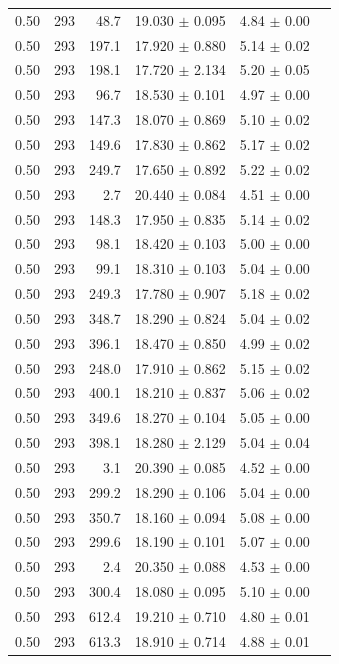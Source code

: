 \begin{table}[ht]
\begin{tabular}{lrrrrr}
0.50 & 293 & 48.7 & 19.030 $\pm$ 0.095 & 4.84 $\pm$ 0.00 \\
0.50 & 293 & 197.1 & 17.920 $\pm$ 0.880 & 5.14 $\pm$ 0.02 \\
0.50 & 293 & 198.1 & 17.720 $\pm$ 2.134 & 5.20 $\pm$ 0.05 \\
0.50 & 293 & 96.7 & 18.530 $\pm$ 0.101 & 4.97 $\pm$ 0.00 \\
0.50 & 293 & 147.3 & 18.070 $\pm$ 0.869 & 5.10 $\pm$ 0.02 \\
0.50 & 293 & 149.6 & 17.830 $\pm$ 0.862 & 5.17 $\pm$ 0.02 \\
0.50 & 293 & 249.7 & 17.650 $\pm$ 0.892 & 5.22 $\pm$ 0.02 \\
0.50 & 293 & 2.7 & 20.440 $\pm$ 0.084 & 4.51 $\pm$ 0.00 \\
0.50 & 293 & 148.3 & 17.950 $\pm$ 0.835 & 5.14 $\pm$ 0.02 \\
0.50 & 293 & 98.1 & 18.420 $\pm$ 0.103 & 5.00 $\pm$ 0.00 \\
0.50 & 293 & 99.1 & 18.310 $\pm$ 0.103 & 5.04 $\pm$ 0.00 \\
0.50 & 293 & 249.3 & 17.780 $\pm$ 0.907 & 5.18 $\pm$ 0.02 \\
0.50 & 293 & 348.7 & 18.290 $\pm$ 0.824 & 5.04 $\pm$ 0.02 \\
0.50 & 293 & 396.1 & 18.470 $\pm$ 0.850 & 4.99 $\pm$ 0.02 \\
0.50 & 293 & 248.0 & 17.910 $\pm$ 0.862 & 5.15 $\pm$ 0.02 \\
0.50 & 293 & 400.1 & 18.210 $\pm$ 0.837 & 5.06 $\pm$ 0.02 \\
0.50 & 293 & 349.6 & 18.270 $\pm$ 0.104 & 5.05 $\pm$ 0.00 \\
0.50 & 293 & 398.1 & 18.280 $\pm$ 2.129 & 5.04 $\pm$ 0.04 \\
0.50 & 293 & 3.1 & 20.390 $\pm$ 0.085 & 4.52 $\pm$ 0.00 \\
0.50 & 293 & 299.2 & 18.290 $\pm$ 0.106 & 5.04 $\pm$ 0.00 \\
0.50 & 293 & 350.7 & 18.160 $\pm$ 0.094 & 5.08 $\pm$ 0.00 \\
0.50 & 293 & 299.6 & 18.190 $\pm$ 0.101 & 5.07 $\pm$ 0.00 \\
0.50 & 293 & 2.4 & 20.350 $\pm$ 0.088 & 4.53 $\pm$ 0.00 \\
0.50 & 293 & 300.4 & 18.080 $\pm$ 0.095 & 5.10 $\pm$ 0.00 \\
0.50 & 293 & 612.4 & 19.210 $\pm$ 0.710 & 4.80 $\pm$ 0.01 \\
0.50 & 293 & 613.3 & 18.910 $\pm$ 0.714 & 4.88 $\pm$ 0.01 \\

\end{tabular}
\end{table}
